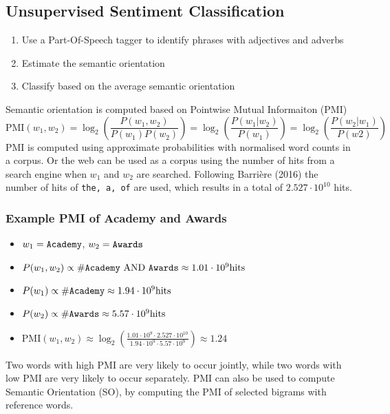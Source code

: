\documentclass[11pt]{article}
\begin{document}
\subsection{Unsupervised Sentiment Classification}
\begin{enumerate}
	\item Use a Part-Of-Speech tagger to identify phrases with adjectives and adverbs
	\item Estimate the semantic orientation
	\item Classify based on the average semantic orientation
\end{enumerate}
Semantic orientation is computed based on Pointwise Mutual Informaiton (PMI)
\begin{equation*}
	\text{PMI} (w_1,w_2) = \log_2 \left( \frac{P(w_1,w_2)}{P(w_1)P(w_2)} \right) = \log_2 \left( \frac{P(w_1 | w_2)}{P(w_1)} \right) = \log_2 \left( \frac{P(w_2 | w_1)}{P(w2)} \right)
\end{equation*}
PMI is computed using approximate probabilities with normalised word counts in a corpus. Or the web can be used as a corpus using the number of hits from a search engine when $w_1$ and $w_2$ are searched. Following Barrière (2016) the number of hits of \texttt{the, a, of} are used, which results in a total of $2.527\cdot 10^10$ hits.
\subsubsection{Example PMI of Academy and Awards}
\begin{itemize}
	\item $w_1 = \text{\texttt{Academy}}$, $w_2 = \text{\texttt{Awards}}$
	\item $P(w_1,w_2) \propto \text{\#\texttt{Academy} AND \texttt{Awards}} \approx 1.01\cdot 10^9\text{hits}$
	\item $P(w_1) \propto \text{\#\texttt{Academy}} \approx 1.94\cdot 10^9 \text{hits}$
	\item $P(w_2) \propto\text{\#\texttt{Awards}} \approx 5.57\cdot 10^9\text{hits} $
	\item $\text{PMI}(w_1,w_2) \approx \log_2\left( \frac{1.01\cdot 10^9\cdot2.527\cdot 10^10}{1.94\cdot 10^9\cdot 5.57\cdot 10^9} \right)\approx 1.24 $
\end{itemize}
Two words with high PMI are very likely to occur jointly, while two words with low PMI are very likely to occur separately. PMI can also be used to compute Semantic Orientation (SO), by computing the PMI of selected bigrams with reference words.
\end{document}
